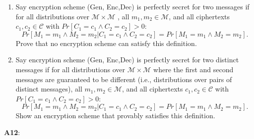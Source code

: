 \documentclass[12pt,reqno]{amsart}
\newcommand{\msgspc}[0]{\mathcal{M}}
\newcommand{\cphspc}[0]{\mathcal{C}}
\begin{document}
\begin{enumerate}[label=\alph*]
\item Say encryption scheme (Gen, Enc,Dec) is perfectly secret for two messages if for all distributions over $\msgspc\times \msgspc$ , all $m_1,m_2 \in \msgspc$, and all ciphertexts $c_1, c_2 \in \cphspc$ with $Pr[C_1 = c_1 \wedge  C_2 = c_2] > 0$:
$$
Pr [M_1 = m_1 \wedge M_2 = m_2 | C_1 = c_1 \wedge C_2 = c_2]= Pr[M_1 = m_1 \wedge M_2 = m_2].
$$
Prove that no encryption scheme can satisfy this definition.


\item Say encryption scheme (Gen, Enc,Dec) is perfectly secret for two distinct messages if for all distributions over $\msgspc\times \msgspc$ where the first and second messages are guaranteed to be different (i.e., distributions over pairs of distinct messages), all $m_1,m_2 \in \msgspc$, and all ciphertexts $c_1, c_2 \in \cphspc$ with $Pr[C_1 = c_1 \wedge  C_2 = c_2] > 0$:
$$
Pr [M_1 = m_1 \wedge M_2 = m_2 | C_1 = c_1 \wedge C_2 = c_2]= Pr[M_1 = m_1 \wedge M_2 = m_2].
$$
Show an encryption scheme that provably satisfies this definition.
\end{enumerate}
\textbf{A12}:  
\end{document}
